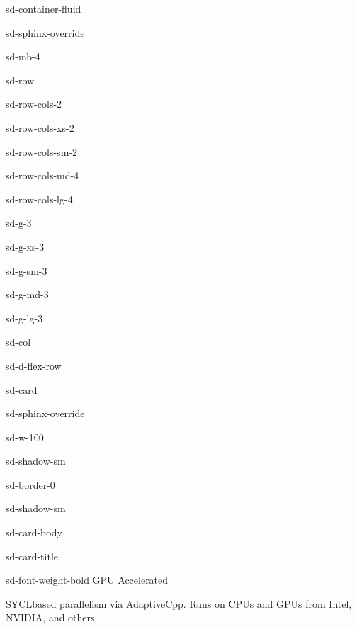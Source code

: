 \documentclass[a4paper,10pt,english]{sphinxmanual}
\begin{document}
\begin{sphinxuseclass}{sd-container-fluid}
\begin{sphinxuseclass}{sd-sphinx-override}
\begin{sphinxuseclass}{sd-mb-4}
\begin{sphinxuseclass}{sd-row}
\begin{sphinxuseclass}{sd-row-cols-2}
\begin{sphinxuseclass}{sd-row-cols-xs-2}
\begin{sphinxuseclass}{sd-row-cols-sm-2}
\begin{sphinxuseclass}{sd-row-cols-md-4}
\begin{sphinxuseclass}{sd-row-cols-lg-4}
\begin{sphinxuseclass}{sd-g-3}
\begin{sphinxuseclass}{sd-g-xs-3}
\begin{sphinxuseclass}{sd-g-sm-3}
\begin{sphinxuseclass}{sd-g-md-3}
\begin{sphinxuseclass}{sd-g-lg-3}
\begin{sphinxuseclass}{sd-col}
\begin{sphinxuseclass}{sd-d-flex-row}
\begin{sphinxuseclass}{sd-card}
\begin{sphinxuseclass}{sd-sphinx-override}
\begin{sphinxuseclass}{sd-w-100}
\begin{sphinxuseclass}{sd-shadow-sm}
\begin{sphinxuseclass}{sd-border-0}
\begin{sphinxuseclass}{sd-shadow-sm}
\begin{sphinxuseclass}{sd-card-body}
\begin{sphinxuseclass}{sd-card-title}
\begin{sphinxuseclass}{sd-font-weight-bold} GPU Accelerated
\end{sphinxuseclass}
\end{sphinxuseclass}
\sphinxAtStartPar
SYCL\sphinxhyphen{}based parallelism via AdaptiveCpp.
Runs on CPUs and GPUs from Intel, NVIDIA, and others.


\end{sphinxuseclass}
\end{sphinxuseclass}
\end{sphinxuseclass}
\end{sphinxuseclass}
\end{sphinxuseclass}
\end{sphinxuseclass}
\end{sphinxuseclass}
\end{sphinxuseclass}
\end{sphinxuseclass}
\end{sphinxuseclass}
\end{sphinxuseclass}
\end{sphinxuseclass}
\end{sphinxuseclass}
\end{sphinxuseclass}
\end{sphinxuseclass}
\end{sphinxuseclass}
\end{sphinxuseclass}
\end{sphinxuseclass}
\end{sphinxuseclass}
\end{sphinxuseclass}
\end{sphinxuseclass}
\end{sphinxuseclass}
\end{sphinxuseclass}
\end{document}
